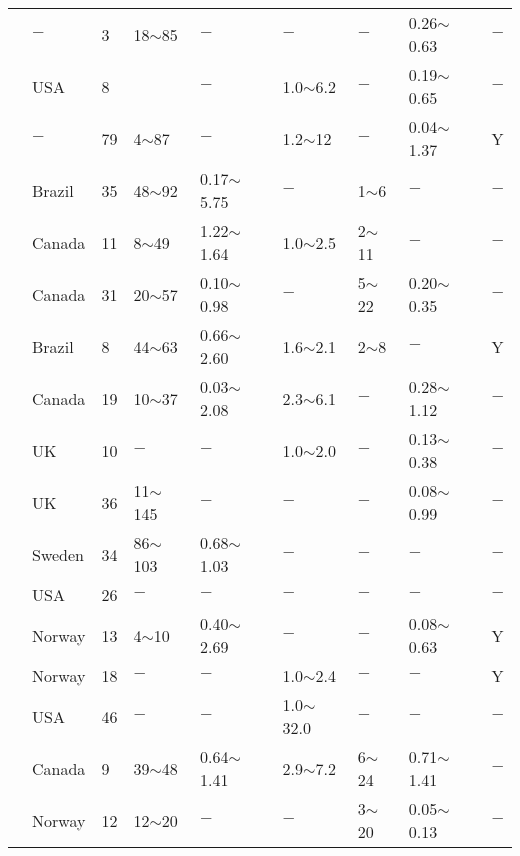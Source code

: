 {\begin{longtable}{lllllllll}
    \citet{Prevost197949} & $-$     & 3     & 18$\sim$85 & $-$     & $-$     & $-$     & 0.26$\sim$0.63 & $-$ \\
    \citet{Quiros1988306} & USA   & 8     &       & $-$     & 1.0$\sim$6.2 & $-$     & 0.19$\sim$0.65 & $-$ \\
    \citet{Rad1988911} & $-$     & 79    & 4$\sim$87  & $-$     & 1.2$\sim$12 & $-$     & 0.04$\sim$1.37 & Y \\
    \citet{Ramalho-Ortigao19831460} & Brazil & 35    & 48$\sim$92 & 0.17$\sim$5.75 & $-$     & 1$\sim$6   & $-$     & $-$ \\
    \citet{Raymond19731} & Canada & 11    & 8$\sim$49  & 1.22$\sim$1.64 & 1.0$\sim$2.5 & 2$\sim$11  & $-$     & $-$ \\
    \citet{Raymond1971546} & Canada & 31    & 20$\sim$57 & 0.10$\sim$0.98 & $-$     & 5$\sim$22  & 0.20$\sim$0.35 & $-$ \\
    \citet{RochaFilho1985859} & Brazil & 8     & 44$\sim$63 & 0.66$\sim$2.60 & 1.6$\sim$2.1 & 2$\sim$8   & $-$     & Y \\
    \citet{Roy1982180} & Canada & 19    & 10$\sim$37 & 0.03$\sim$2.08 & 2.3$\sim$6.1 & $-$     & 0.28$\sim$1.12 & $-$ \\
    \citet{Sanchez1979257} & UK    & 10    & $-$     & $-$     & 1.0$\sim$2.0 & $-$     & 0.13$\sim$0.38 & $-$ \\
    \citet{Schofield1968} & UK    & 36    & 11$\sim$145 & $-$     & $-$     & $-$     & 0.08$\sim$0.99 & $-$ \\
    \citet{Schwab1976647} & Sweden & 34    & 86$\sim$103 & 0.68$\sim$1.03 & $-$     & $-$     & $-$     & $-$ \\
    \citet{Seed1957731} & USA   & 26    & $-$     & $-$     & $-$     & $-$     & $-$     & $-$ \\
    \citet{Senneset198541} & Norway & 13    & 4$\sim$10  & 0.40$\sim$2.69 & $-$     & $-$     & 0.08$\sim$0.63 & Y \\
    \citet{Senneset1988955} & Norway & 18    & $-$     & $-$     & 1.0$\sim$2.4 & $-$     & $-$     & Y \\
    \citet{Sherif1972439} & USA   & 46    & $-$     & $-$     & 1.0$\sim$32.0 & $-$     & $-$     & $-$ \\
    \citet{Silvestri198888} & Canada & 9     & 39$\sim$48 & 0.64$\sim$1.41 & 2.9$\sim$7.2 & 6$\sim$24  & 0.71$\sim$1.41 & $-$ \\
    \citet{Simons1960727} & Norway & 12    & 12$\sim$20 & $-$     & $-$     & 3$\sim$20  & 0.05$\sim$0.13 & $-$ \\

\end{longtable}}
